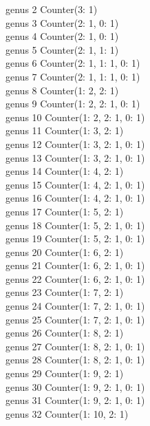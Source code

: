 genus 2   Counter({3: 1}) \\
genus 3   Counter({2: 1, 0: 1}) \\
genus 4   Counter({2: 1, 0: 1})\\
genus 5   Counter({2: 1, 1: 1})\\
genus 6   Counter({2: 1, 1: 1, 0: 1})\\
genus 7   Counter({2: 1, 1: 1, 0: 1})\\
genus 8   Counter({1: 2, 2: 1})\\
genus 9   Counter({1: 2, 2: 1, 0: 1})\\
genus 10   Counter({1: 2, 2: 1, 0: 1})\\
genus 11   Counter({1: 3, 2: 1})\\
genus 12   Counter({1: 3, 2: 1, 0: 1})\\
genus 13   Counter({1: 3, 2: 1, 0: 1})\\
genus 14   Counter({1: 4, 2: 1})\\
genus 15   Counter({1: 4, 2: 1, 0: 1})\\
genus 16   Counter({1: 4, 2: 1, 0: 1})\\
genus 17   Counter({1: 5, 2: 1})\\
genus 18   Counter({1: 5, 2: 1, 0: 1})\\
genus 19   Counter({1: 5, 2: 1, 0: 1})\\
genus 20   Counter({1: 6, 2: 1})\\
genus 21   Counter({1: 6, 2: 1, 0: 1})\\
genus 22   Counter({1: 6, 2: 1, 0: 1})\\
genus 23   Counter({1: 7, 2: 1})\\
genus 24   Counter({1: 7, 2: 1, 0: 1})\\
genus 25   Counter({1: 7, 2: 1, 0: 1})\\
genus 26   Counter({1: 8, 2: 1})\\
genus 27   Counter({1: 8, 2: 1, 0: 1})\\
genus 28   Counter({1: 8, 2: 1, 0: 1})\\
genus 29   Counter({1: 9, 2: 1})\\
genus 30   Counter({1: 9, 2: 1, 0: 1})\\
genus 31   Counter({1: 9, 2: 1, 0: 1})\\
genus 32   Counter({1: 10, 2: 1})\\

